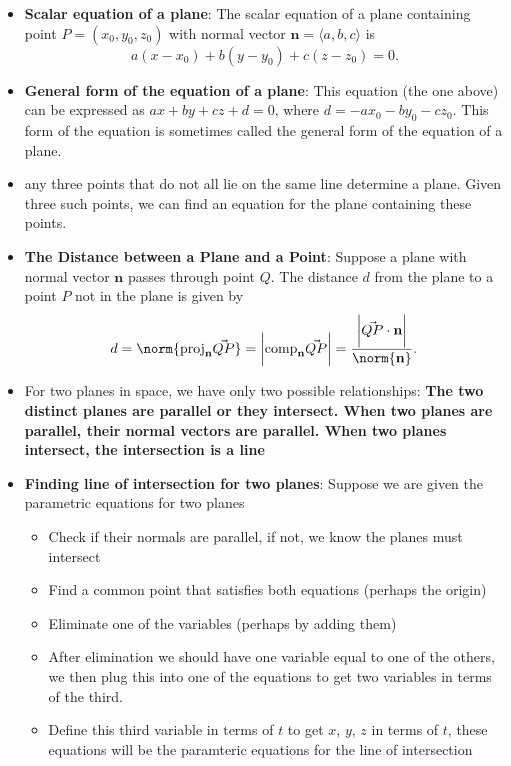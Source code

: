 \documentclass{report}
\begin{document}
\begin{itemize}
    \item \textbf{Scalar equation of a plane}:
        The scalar equation of a plane containing point $P=(x_0, y_0, z_0)$ with normal vector $\mathbf{n}=\langle a, b, c \rangle$ is
        \[
            a(x-x_0) + b(y-y_0) + c(z-z_0) = 0.
        \]
    \item \textbf{General form of the equation of a plane}:
        This equation (the one above) can be expressed as $ax + by + cz + d = 0$, where $d = -ax_0 - by_0 - cz_0$. This form of the equation is sometimes called the general form of the equation of a plane.
    \item any three points that do not all lie on the same line determine a plane. Given three such points, we can find an equation for the plane containing these points.
    \item \textbf{The Distance between a Plane and a Point}: 
        Suppose a plane with normal vector  $\mathbf{n}$ passes through point  $Q$. The distance  $d$ from the plane to a point  $P$ not in the plane is given by
        \begin{align*}
             d = \norm{\text{proj}_{\mathbf{n}}\vec{QP}} = \bigg\lvert \text{comp}_{\mathbf{n}}\vec{QP} \bigg\rvert = \frac{\bigg\lvert \vec{QP} \cdot \mathbf{n} \bigg\rvert}{\norm{\mathbf{n}}}
        .\end{align*}
    \item For two planes in space, we have only two possible relationships: \textbf{The two distinct planes are parallel or they intersect. When two planes are parallel, their normal vectors are parallel. When two planes intersect, the intersection is a line}
    \item \textbf{Finding line of intersection for two planes}: Suppose we are given the parametric equations for two planes
        \begin{itemize}
            \item Check if their normals are parallel, if not, we know the planes must intersect
            \item Find a common point that satisfies both equations (perhaps the origin)
            \item Eliminate one of the variables (perhaps by adding them)
            \item After elimination we should have one variable equal to one of the others, we then plug this into one of the equations to get two variables in terms of the third.
            \item Define this third variable in terms of $t$ to get $x$, $y$, $z$ in terms of $t$, these equations will be the paramteric equations for the line of intersection

\end{itemize}
\end{itemize}
\end{document}
